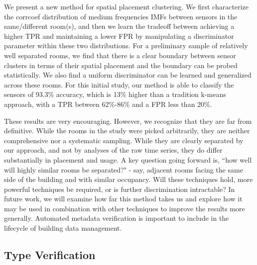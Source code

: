 We present a new method for spatial placement clustering.  
We first characterize the corrcoef distribution of medium frequencies IMFs between sensors in the same/different room(s), and then we learn the tradeoff between achieving a higher TPR and maintaining a lower FPR by manipulating a discriminator parameter within these two distributions. 
For a preliminary sample of relatively well separated rooms, we find that there is a clear boundary between sensor clusters in terms of their spatial placement and the boundary can be probed statistically.  We also find 
a uniform discriminator can be learned and generalized across these rooms.  
For this initial study, our method is able to classify the sensors of 93.3\% accuracy, which is 13\% higher than a tradition k-means approach, with a TPR between 62\%-86\% and a FPR less than 20\%. 

These results are very encouraging. However, we recognize that they are far from definitive. While the rooms in the study were picked arbitrarily, they are neither comprehensive nor a systematic sampling.  While they are clearly separated by our approach, and not by analyses of the raw time series, they do differ substantially in placement and usage.  A key question going forward is, ``how well will highly similar rooms be separated?"  - say, adjacent rooms facing the same side of the building and with similar occupancy. Will these techniques hold, more powerful techniques be required, or is further discrimination intractable? In future work, we will examine how far this method takes us and explore how it may be used in combination with other techniques to improve the results more generally. Automated metadata verification is important to include in the lifecycle of building data management.



\subsection{Type Verification}








